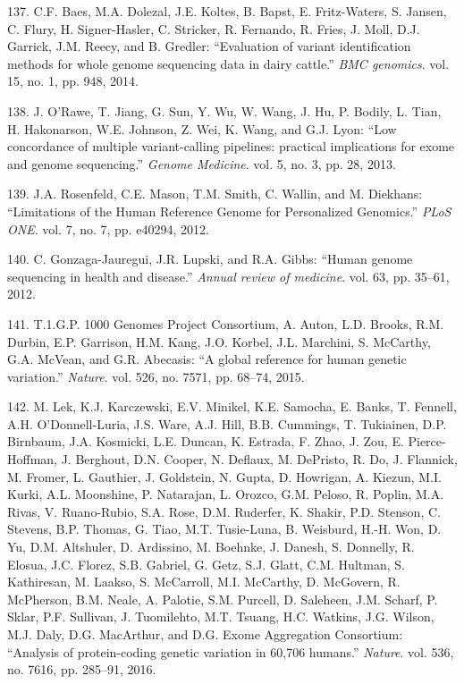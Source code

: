 \documentclass[12pt,twoside]{reedthesis}
\theoremstyle{definition}
\theoremstyle{definition}
\theoremstyle{remark}
\begin{document}
  \hypertarget{ref-Baes2014}{}
  137. C.F. Baes, M.A. Dolezal, J.E. Koltes, B. Bapst, E. Fritz-Waters, S.
  Jansen, C. Flury, H. Signer-Hasler, C. Stricker, R. Fernando, R. Fries,
  J. Moll, D.J. Garrick, J.M. Reecy, and B. Gredler: ``Evaluation of
  variant identification methods for whole genome sequencing data in dairy
  cattle.'' \emph{BMC genomics}. vol. 15, no. 1, pp. 948, 2014.
  
  \hypertarget{ref-ORawe2013}{}
  138. J. O'Rawe, T. Jiang, G. Sun, Y. Wu, W. Wang, J. Hu, P. Bodily, L.
  Tian, H. Hakonarson, W.E. Johnson, Z. Wei, K. Wang, and G.J. Lyon: ``Low
  concordance of multiple variant-calling pipelines: practical
  implications for exome and genome sequencing.'' \emph{Genome Medicine}.
  vol. 5, no. 3, pp. 28, 2013.
  
  \hypertarget{ref-Rosenfeld2012}{}
  139. J.A. Rosenfeld, C.E. Mason, T.M. Smith, C. Wallin, and M. Diekhans:
  ``Limitations of the Human Reference Genome for Personalized Genomics.''
  \emph{PLoS ONE}. vol. 7, no. 7, pp. e40294, 2012.
  
  \hypertarget{ref-Gonzaga-Jauregui2012}{}
  140. C. Gonzaga-Jauregui, J.R. Lupski, and R.A. Gibbs: ``Human genome
  sequencing in health and disease.'' \emph{Annual review of medicine}.
  vol. 63, pp. 35--61, 2012.
  
  \hypertarget{ref-1000GenomesProjectConsortium2015}{}
  141. T.1.G.P. 1000 Genomes Project Consortium, A. Auton, L.D. Brooks,
  R.M. Durbin, E.P. Garrison, H.M. Kang, J.O. Korbel, J.L. Marchini, S.
  McCarthy, G.A. McVean, and G.R. Abecasis: ``A global reference for human
  genetic variation.'' \emph{Nature}. vol. 526, no. 7571, pp. 68--74,
  2015.
  
  \hypertarget{ref-Lek2016}{}
  142. M. Lek, K.J. Karczewski, E.V. Minikel, K.E. Samocha, E. Banks, T.
  Fennell, A.H. O'Donnell-Luria, J.S. Ware, A.J. Hill, B.B. Cummings, T.
  Tukiainen, D.P. Birnbaum, J.A. Kosmicki, L.E. Duncan, K. Estrada, F.
  Zhao, J. Zou, E. Pierce-Hoffman, J. Berghout, D.N. Cooper, N. Deflaux,
  M. DePristo, R. Do, J. Flannick, M. Fromer, L. Gauthier, J. Goldstein,
  N. Gupta, D. Howrigan, A. Kiezun, M.I. Kurki, A.L. Moonshine, P.
  Natarajan, L. Orozco, G.M. Peloso, R. Poplin, M.A. Rivas, V.
  Ruano-Rubio, S.A. Rose, D.M. Ruderfer, K. Shakir, P.D. Stenson, C.
  Stevens, B.P. Thomas, G. Tiao, M.T. Tusie-Luna, B. Weisburd, H.-H. Won,
  D. Yu, D.M. Altshuler, D. Ardissino, M. Boehnke, J. Danesh, S. Donnelly,
  R. Elosua, J.C. Florez, S.B. Gabriel, G. Getz, S.J. Glatt, C.M. Hultman,
  S. Kathiresan, M. Laakso, S. McCarroll, M.I. McCarthy, D. McGovern, R.
  McPherson, B.M. Neale, A. Palotie, S.M. Purcell, D. Saleheen, J.M.
  Scharf, P. Sklar, P.F. Sullivan, J. Tuomilehto, M.T. Tsuang, H.C.
  Watkins, J.G. Wilson, M.J. Daly, D.G. MacArthur, and D.G. Exome
  Aggregation Consortium: ``Analysis of protein-coding genetic variation
  in 60,706 humans.'' \emph{Nature}. vol. 536, no. 7616, pp. 285--91,
  2016.
  
\end{document}
